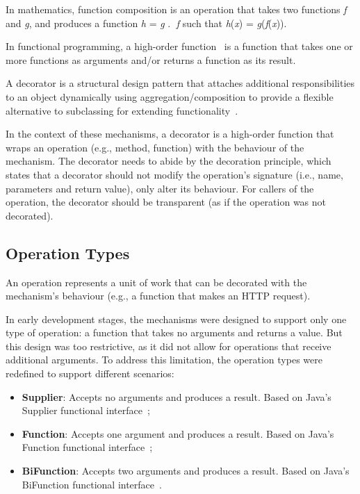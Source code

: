 In mathematics,
function composition is an operation that takes two functions \textit{f} and \textit{g}, and produces a function \textit{h} = \textit{g} \textcircled{.} \textit{f} such that \textit{h}(\textit{x}) = \textit{g}(\textit{f}(\textit{x})).

In functional programming, a high-order function~\cite{higher-order-functions} is a function
that takes one or more functions as arguments and/or returns a function as its result.

A decorator is a structural design pattern
that attaches additional responsibilities to an object dynamically using aggregation/composition to provide a flexible alternative to subclassing for extending functionality~\cite{design-patterns}.

In the context of these mechanisms,
a decorator is a high-order function that wraps an operation
(e.g., method, function) with the behaviour of the mechanism.
The decorator needs to abide by the decoration principle,
which states that a decorator should not modify the operation's signature (i.e., name, parameters and return value), only alter its behaviour.
For callers of the operation, the decorator should be transparent (as if the operation was not decorated).

\subsection{Operation Types}\label{subsec:operation-types}

An operation represents a unit of work that can be decorated with the mechanism's behaviour (e.g., a function that makes an HTTP request).

In early development stages, the mechanisms were designed to support only one type of operation:
a function that takes no arguments and returns a value.
But this design was too restrictive, as it did not allow for operations that receive additional arguments.
To address this limitation, the operation types were redefined to support different scenarios:

\begin{itemize}
    \item \textbf{Supplier}: Accepts no arguments and produces a result.
    Based on Java's Supplier functional interface~\cite{java-supplier};
    \item \textbf{Function}: Accepts one argument and produces a result.
    Based on Java's Function functional interface~\cite{java-function};
    \item \textbf{BiFunction}: Accepts two arguments and produces a result.
    Based on Java's BiFunction functional interface~\cite{java-bifunction}.
\end{itemize}

